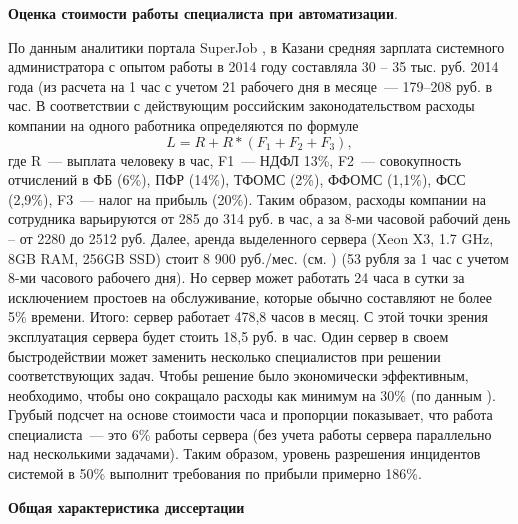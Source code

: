 \textbf{Оценка стоимости работы специалиста при автоматизации}.\par
По данным аналитики портала SuperJob \cite{SuperJob}, в Казани средняя зарплата системного администратора с опытом работы в 2014 году составляла 30 – 35 тыс. руб. 2014 года (из расчета на 1 час с учетом 21 рабочего дня в месяце~--- 179--208 руб. в час. В соответствии с действующим российским законодательством \cite{FiscalCodecs} расходы компании на одного работника определяются по формуле
\[
L = R + R*(F_1 +F_2+F_3),
\]
где R~--- выплата человеку в час, F1~--- НДФЛ 13\%, F2~--- совокупность отчислений в ФБ (6\%), ПФР (14\%), ТФОМС (2\%), ФФОМС (1,1\%), ФСС (2,9\%), F3~--- налог на прибыль (20\%). Таким образом, расходы компании на сотрудника варьируются от 285 до 314 руб. в час, а за 8-ми часовой рабочий день – от 2280 до 2512 руб. Далее, аренда выделенного сервера (Xeon X3, 1.7 GHz, 8GB RAM, 256GB SSD) стоит 8 900 руб./мес. (см. \cite{TimeWeb}) (53 рубля за 1 час с учетом 8-ми часового рабочего дня). Но сервер может работать 24 часа в сутки за исключением простоев на обслуживание, которые обычно составляют не более 5\% времени. Итого: сервер работает 478,8 часов в месяц. С этой точки зрения эксплуатация сервера будет стоить 18,5 руб. в час. Один сервер в своем быстродействии может заменить несколько специалистов при решении соответствующих задач. Чтобы решение было экономически эффективным, необходимо, чтобы оно сокращало расходы как минимум на 30\% (по данным \icl). Грубый подсчет на основе стоимости часа и пропорции показывает, что работа специалиста~--- это 6\% работы сервера (без учета работы сервера параллельно над несколькими задачами). Таким образом, уровень разрешения инцидентов системой в 50\% выполнит требования по прибыли примерно 186\%.

\textbf{Общая характеристика диссертации} 
\newcommand{\actuality}{\underline{\textbf{Актуальность темы.}}}
\newcommand{\aim}{{\textbf{Целью}}}
\newcommand{\tasks}{{\textbf{задачи}}}
\newcommand{\scope}{{\textbf{Область исследования}}}
\newcommand{\subject}{{\textbf{Предметом исследования}}}
\newcommand{\methods}{{\textbf{Методы исследования}}}
\newcommand{\defpositions}{{\textbf{Основные положения, выносимые на~защиту:}}}
\newcommand{\novelty}{{\textbf{Научная новизна}}}
\newcommand{\influence}{{\textbf{Практическая значимость.}}}
\newcommand{\reliability}{{\textbf{Достоверность}}}
\newcommand{\probation}{{\textbf{Апробация работы.}}}
\newcommand{\contribution}{{\textbf{Личный вклад.}}}
\newcommand{\publications}{{\textbf{Публикации.}}}

